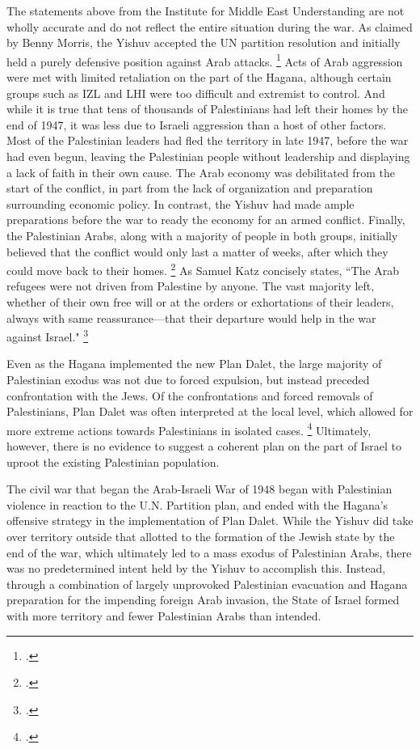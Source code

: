 \documentclass[11pt]{turabian-researchpaper}
\begin{document}
The statements above from the Institute for Middle East Understanding are not wholly accurate and do not reflect the entire situation during the war.  As claimed by Benny Morris, the Yishuv accepted the UN partition resolution and initially held a purely defensive position against Arab attacks.
\footcite[][98-100]{morris}
Acts of Arab aggression were met with limited retaliation on the part of the Hagana, although certain groups such as IZL and LHI were too difficult and extremist to control.
And while it is true that tens of thousands of Palestinians had left their homes by the end of 1947, it was less due to Israeli aggression than a host of other factors.  Most of the Palestinian leaders had fled the territory in late 1947, before the war had even begun, leaving the Palestinian people without leadership and displaying a lack of faith in their own cause.  The Arab economy was debilitated from the start of the conflict, in part from the lack of organization and preparation surrounding economic policy.  In contrast, the Yishuv had made ample preparations before the war to ready the economy for an armed conflict.  Finally, the Palestinian Arabs, along with a majority of people in both groups, initially believed that the conflict would only last a matter of weeks, after which they could move back to their homes.
\footcite[][84-85]{pappe}
As Samuel Katz concisely states, ``The Arab refugees were not driven from Palestine by anyone.  The vast majority left, whether of their own free will or at the orders or exhortations of their leaders, always with same reassurance—that their departure would help in the war against Israel."
\footcite[][64]{dajani}



Even as the Hagana implemented the new Plan Dalet, the large majority of Palestinian exodus was not due to forced expulsion, but instead preceded confrontation with the Jews.  Of the confrontations and forced removals of Palestinians, Plan Dalet was often interpreted at the local level, which allowed for more extreme actions towards Palestinians in isolated cases.
\footcite[][94]{morris}
Ultimately, however, there is no evidence to suggest a coherent plan on the part of Israel to uproot the existing Palestinian population.

The civil war that began the Arab-Israeli War of 1948 began with Palestinian violence in reaction to the U.N. Partition plan, and ended with the Hagana's offensive strategy in the implementation of Plan Dalet.  While the Yishuv did take over territory outside that allotted to the formation of the Jewish state by the end of the war, which ultimately led to a mass exodus of Palestinian Arabs, there was no predetermined intent held by the Yishuv to accomplish this.  Instead, through a combination of largely unprovoked Palestinian evacuation and Hagana preparation for the impending foreign Arab invasion, the State of Israel formed with more territory and fewer Palestinian Arabs than intended.
\end{document}
